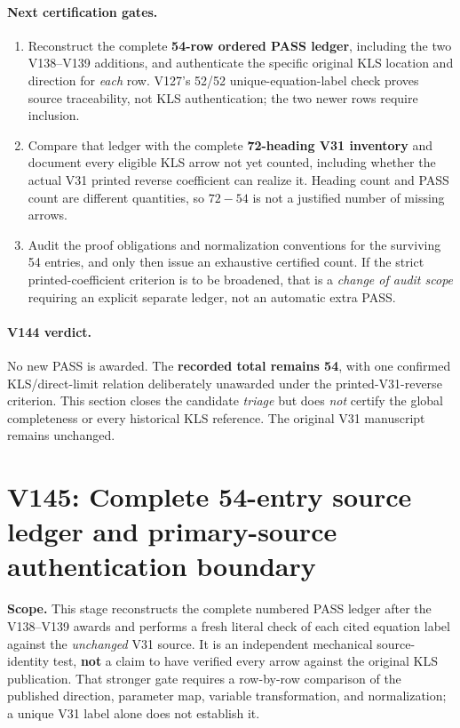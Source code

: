 \documentclass[11pt]{article}
\begin{document}
\paragraph{Next certification gates.}
\begin{enumerate}
\item Reconstruct the complete \textbf{54-row ordered PASS ledger}, including the two V138--V139 additions, and authenticate the specific original KLS location and direction for \emph{each} row. V127's 52/52 unique-equation-label check proves source traceability, not KLS authentication; the two newer rows require inclusion.
\item Compare that ledger with the complete \textbf{72-heading V31 inventory} and document every eligible KLS arrow not yet counted, including whether the actual V31 printed reverse coefficient can realize it. Heading count and PASS count are different quantities, so $72-54$ is not a justified number of missing arrows.
\item Audit the proof obligations and normalization conventions for the surviving 54 entries, and only then issue an exhaustive certified count. If the strict printed-coefficient criterion is to be broadened, that is a \emph{change of audit scope} requiring an explicit separate ledger, not an automatic extra PASS.
\end{enumerate}
\paragraph{V144 verdict.} No new PASS is awarded. The \textbf{recorded total remains 54}, with one confirmed KLS/direct-limit relation deliberately unawarded under the printed-V31-reverse criterion. This section closes the candidate \emph{triage} but does \emph{not} certify the global completeness or every historical KLS reference. The original V31 manuscript remains unchanged.


\clearpage
\section{V145: Complete 54-entry source ledger and primary-source authentication boundary}
\label{sec:v145-full-ledger}
\noindent\textbf{Scope.} This stage reconstructs the complete numbered PASS ledger after the V138--V139 awards and performs a fresh literal check of each cited equation label against the \emph{unchanged} V31 source. It is an independent mechanical source-identity test, \textbf{not} a claim to have verified every arrow against the original KLS publication. That stronger gate requires a row-by-row comparison of the published direction, parameter map, variable transformation, and normalization; a unique V31 label alone does not establish it.
\end{document}
